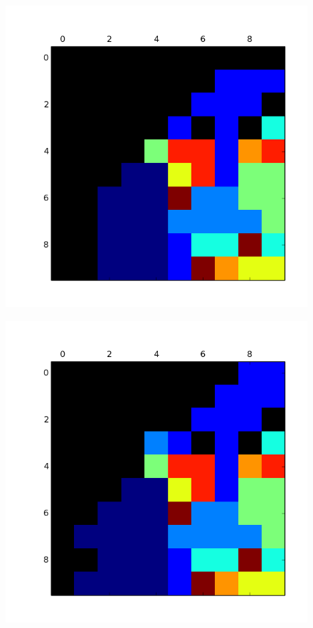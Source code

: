 \begin{figure}[h!]
\begin{minipage}{.15\textwidth}
  \label{fig:test2}
\end{minipage}
\begin{minipage}{.15\textwidth}
  \centering
  \includegraphics[width=.9\linewidth]{img/convergencia_kohonen/entrenamiento_50.png}
  \label{fig:test2}
\end{minipage}
\begin{minipage}{.15\textwidth}
  \centering
  \includegraphics[width=.9\linewidth]{img/convergencia_kohonen/entrenamiento_75.png}

\end{minipage}
\end{figure}
